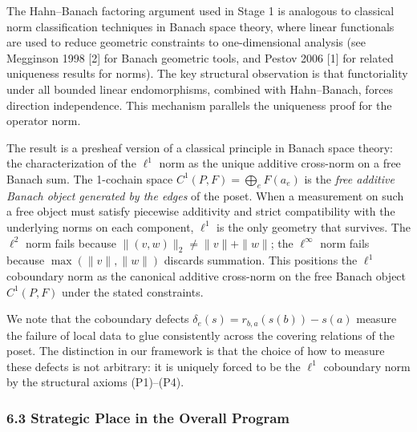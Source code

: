 \documentclass[
]{article}
\begin{document}
The Hahn--Banach factoring argument used in Stage 1 is analogous to
classical norm classification techniques in Banach space theory, where
linear functionals are used to reduce geometric constraints to
one-dimensional analysis (see Megginson 1998 {[}2{]} for Banach
geometric tools, and Pestov 2006 {[}1{]} for related uniqueness results
for norms). The key structural observation is that functoriality under
all bounded linear endomorphisms, combined with Hahn--Banach, forces
direction independence. This mechanism parallels the uniqueness proof
for the operator norm.

The result is a presheaf version of a classical principle in Banach
space theory: the characterization of the \(\ell^1\) norm as the unique
additive cross-norm on a free Banach sum. The 1-cochain space
\(C^1(P, F) = \bigoplus_e F(a_e)\) is the \emph{free additive Banach
object generated by the edges} of the poset. When a measurement on such
a free object must satisfy piecewise additivity and strict compatibility
with the underlying norms on each component, \(\ell^1\) is the only
geometry that survives. The \(\ell^2\) norm fails because
\(\|(v, w)\|_2 \neq \|v\| + \|w\|\); the \(\ell^\infty\) norm fails
because \(\max(\|v\|, \|w\|)\) discards summation. This positions the
\(\ell^1\) coboundary norm as the canonical additive cross-norm on the
free Banach object \(C^1(P,F)\) under the stated constraints.

We note that the coboundary defects
\(\delta_e(s) = r_{b,a}(s(b)) - s(a)\) measure the failure of local data
to glue consistently across the covering relations of the poset. The
distinction in our framework is that the choice of how to measure these
defects is not arbitrary: it is uniquely forced to be the \(\ell^1\)
coboundary norm by the structural axioms (P1)--(P4).

\subsubsection{6.3 Strategic Place in the Overall
Program}\label{strategic-place-in-the-overall-program}
\end{document}

